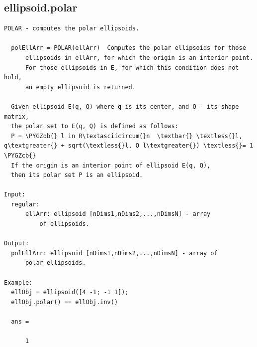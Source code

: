 \documentclass[letterpaper,10pt,english]{sphinxmanual}
\def\PYGZob{\char`\{}
\def\PYGZcb{\char`\}}
\begin{document}
\subsection{ellipsoid.polar}
\label{chap_functions:ellipsoid-polar}
\begin{Verbatim}[commandchars=\\\{\}]
POLAR - computes the polar ellipsoids.

  polEllArr = POLAR(ellArr)  Computes the polar ellipsoids for those
      ellipsoids in ellArr, for which the origin is an interior point.
      For those ellipsoids in E, for which this condition does not hold,
      an empty ellipsoid is returned.

  Given ellipsoid E(q, Q) where q is its center, and Q - its shape matrix,
  the polar set to E(q, Q) is defined as follows:
  P = \PYGZob{} l in R\textasciicircum{}n  \textbar{} \textless{}l, q\textgreater{} + sqrt(\textless{}l, Q l\textgreater{}) \textless{}= 1 \PYGZcb{}
  If the origin is an interior point of ellipsoid E(q, Q),
  then its polar set P is an ellipsoid.

Input:
  regular:
      ellArr: ellipsoid [nDims1,nDims2,...,nDimsN] - array
          of ellipsoids.

Output:
  polEllArr: ellipsoid [nDims1,nDims2,...,nDimsN] - array of
      polar ellipsoids.

Example:
  ellObj = ellipsoid([4 -1; -1 1]);
  ellObj.polar() == ellObj.inv()

  ans =

      1
\end{Verbatim}
\end{document}
